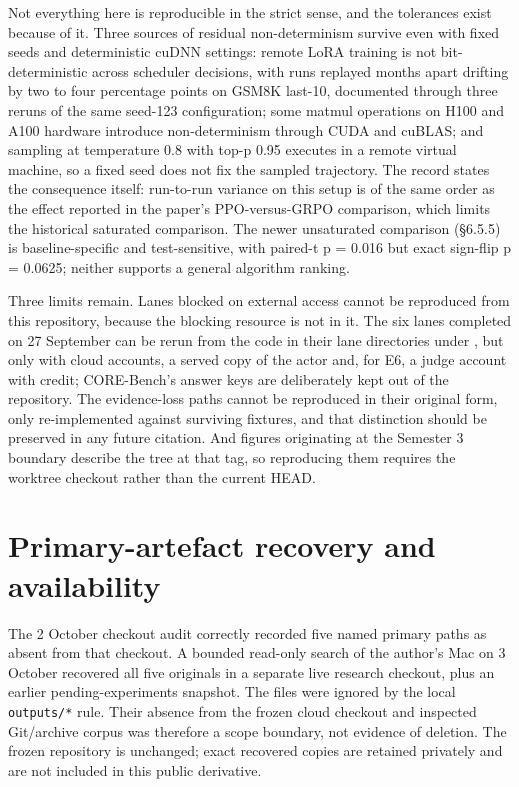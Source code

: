 \documentclass[12pt,a4paper]{report}
\DeclareRobustCommand{\longtok}[1]{\texttt{\seqsplit{#1}}}
\begin{document}
Not everything here is reproducible in the strict sense, and the
tolerances exist because of it. Three sources of residual
non-determinism survive even with fixed seeds and deterministic cuDNN
settings: remote LoRA training is not bit-deterministic across scheduler
decisions, with runs replayed months apart drifting by two to four
percentage points on GSM8K last-10, documented through three reruns of
the same seed-123 configuration; some matmul operations on H100 and A100
hardware introduce non-determinism through CUDA and cuBLAS; and sampling
at temperature 0.8 with top-p 0.95 executes in a remote virtual machine,
so a fixed seed does not fix the sampled trajectory. The record states
the consequence itself: run-to-run variance on this setup is of the same
order as the effect reported in the paper's PPO-versus-GRPO comparison,
which limits the historical saturated comparison. The newer unsaturated
comparison (§6.5.5) is baseline-specific and test-sensitive, with
paired-t p = 0.016 but exact sign-flip p = 0.0625; neither supports a
general algorithm ranking.

Three limits remain. Lanes blocked on external access cannot be
reproduced from this repository, because the blocking resource is not in
it. The six lanes completed on 27 September can be rerun from the code
in their lane directories under
\longtok{outputs/finish\_\allowbreak{}pending\_\allowbreak{}2026-09-27/}, but only with cloud
accounts, a served copy of the actor and, for E6, a judge account with
credit; CORE-Bench's answer keys are deliberately kept out of the
repository. The evidence-loss paths cannot be reproduced in their
original form, only re-implemented against surviving fixtures, and that
distinction should be preserved in any future citation. And figures
originating at the Semester 3 boundary describe the tree at that tag, so
reproducing them requires the worktree checkout rather than the current
HEAD.

\section{Primary-artefact recovery and
availability}\label{primary-artefact-recovery-and-availability}

The 2 October checkout audit correctly recorded five named primary paths
as absent from that checkout. A bounded read-only search of the author's
Mac on 3 October recovered all five originals in a separate live
research checkout, plus an earlier pending-experiments snapshot. The
files were ignored by the local \texttt{outputs/*} rule. Their absence
from the frozen cloud checkout and inspected Git/archive corpus was
therefore a scope boundary, not evidence of deletion. The frozen
repository is unchanged; exact recovered copies are retained privately
and are not included in this public derivative.
\end{document}
